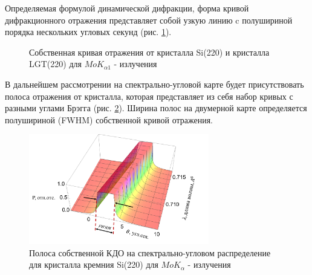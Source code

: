 \label{sec:rocking_curve_section}

Определяемая формулой динамической дифракции, форма кривой дифракционного отражения
представляет собой узкую линию c полушириной порядка нескольких угловых секунд
(рис. \ref{ris:darwin_methody}).


\begin{figure}[H]
  \centering
  \hfill
  \caption{Собственная кривая отражения от кристалла Si(220) и
  кристалла LGT(220) для $MoK_{\alpha 1}$ - излучения}
  \label{ris:darwin_methody}
\end{figure}

В дальнейшем рассмотрении на спектрально-угловой карте будет присутствовать
полоса отражения от кристалла, которая представляет из себя набор кривых с
разными углами Брэгга (рис. \ref{ris:darwin_lambda}).
Ширина полос на двумерной карте определяется полушириной (FWHM)
собственной кривой отражения.

\begin{figure}[H]
\centering
\includegraphics[width=0.7\textwidth]{images/darwin_lambda.png}
\caption{Полоса собственной КДО на спектрально-угловом распределение для кристалла
кремния  Si(220) для $MoK_{\alpha}$ - излучения }
\label{ris:darwin_lambda}
\end{figure}

